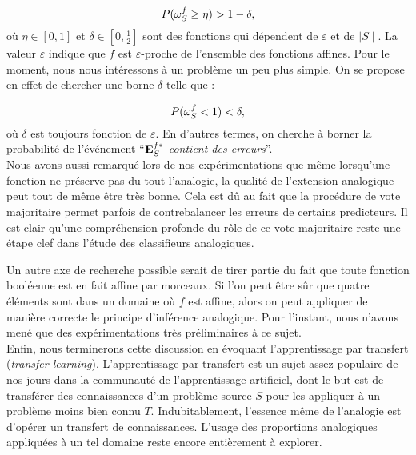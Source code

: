$$P(\omega_{S}^{f} \geq \eta) > 1 - \delta,$$
où $\eta \in [0, 1]$ et $\delta \in [0, \frac{1}{2}]$ sont des fonctions 
qui dépendent de $\varepsilon$ et de $\mid S \mid$. La valeur $\varepsilon$
indique que $f$ est $\varepsilon$-proche de l'ensemble des fonctions affines.
Pour le moment, nous nous intéressons à un problème un peu plus simple. On se
propose en effet de chercher une borne $\delta$ telle que :

$$P(\omega_{S}^{f} < 1) < \delta,$$
où $\delta$ est toujours fonction de $\varepsilon$.  En d'autres termes, on
cherche à borner la probabilité de l'événement ``\textit{$\mathbf{E}_{S}^{f*}$ contient des
erreurs}''.\\


Nous avons aussi remarqué lors de nos expérimentations que même lorsqu'une
fonction ne préserve pas du tout l'analogie, la qualité de l'extension
analogique peut tout de même être très bonne. Cela est dû au fait que la
procédure de vote majoritaire permet parfois de contrebalancer les erreurs de
certains predicteurs. Il est clair qu'une compréhension profonde du rôle de ce
vote majoritaire reste une étape clef dans l'étude des classifieurs
analogiques.

Un autre axe de recherche possible serait de tirer partie du fait que toute
fonction booléenne est en fait affine par morceaux. Si l'on peut être sûr que
quatre éléments sont dans un domaine où $f$ est affine, alors on peut appliquer
de manière correcte le principe d'inférence analogique. Pour l'instant, nous
n'avons mené que des expérimentations très préliminaires  à ce sujet.\\

Enfin, nous terminerons cette discussion en évoquant l'apprentissage par
transfert (\textit{transfer learning}). L'apprentissage par transfert est un
sujet assez populaire de nos jours dans la communauté de l'apprentissage
artificiel, dont le but est de transférer des connaissances d'un problème
source $S$ pour les appliquer à un problème moins bien connu $T$.
Indubitablement, l'essence même de l'analogie est d'opérer un transfert de
connaissances. L'usage des proportions analogiques appliquées à un tel domaine
reste encore entièrement à explorer.
